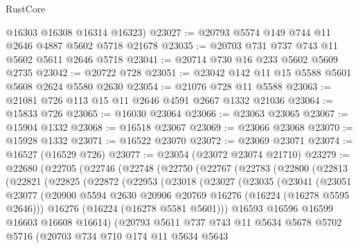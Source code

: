 \begin{lexlean}{RustCore}
\begin{coremodule}
      @16303
      @16308
      @16314
      @16323)
@23027 := @20793 @5574 @149 @744 @11 @2646 @4887 @5602 @5718 @21678
@23035 := @20703 @731 @737 @743 @11 @5602 @5611 @2646 @5718
@23041 := @20714 @730 @16 @233 @5602 @5609 @2735
@23042 := @20722 @728
@23051 := @23042 @142 @11 @15 @5588 @5601 @5608 @2624 @5580 @2630
@23054 := @21076 @728 @11 @5588
@23063 := @21081 @726 @113 @15 @11 @2646 @4591 @2667 @1332 @21036
@23064 := @15833 @726
@23065 := @16030 @23064
@23066 := @23063 @23065
@23067 := @15904 @1332
@23068 := @16518 @23067
@23069 := @23066 @23068
@23070 := @15928 @1332
@23071 := @16522 @23070
@23072 := @23069 @23071
@23074 := @16527 (@16529 @726)
@23077 := @23054 (@23072 @23074 @21710)
@23279 := @22680
    (@22705
      (@22746
        (@22748
          (@22750
            (@22767
              (@22783
                (@22800
                  (@22813
                    (@22821
                      (@22825
                        (@22872
                          (@22953
                            (@23018
                              (@23027
                                (@23035
                                  (@23041
                                    (@23051
                                      @23077
                                      (@20900
                                        @5594
                                        @2630
                                        @20906
                                        @20769
                                        @16276
                                        (@16224 (@16278 @5595 @2646)))
                                      @16276
                                      (@16224 (@16278 @5581 @5601)))
                                    @16593
                                    @16596
                                    @16599
                                    @16603
                                    @16608
                                    @16614)
                                  (@20793
                                    @5611
                                    @737
                                    @743
                                    @11
                                    @5634
                                    @5678
                                    @5702
                                    @5716
                                    (@20703
                                      @734
                                      @710
                                      @174
                                      @11
                                      @5634
                                      @5643

\end{coremodule}
\end{lexlean}
